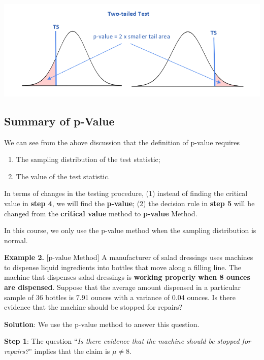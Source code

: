 \documentclass[
]{book}
\begin{document}
\begin{center}\includegraphics[width=0.65\linewidth]{week09/twoTailedPVal} \end{center}

\hypertarget{summary-of-p-value}{%
\subsection{Summary of p-Value}\label{summary-of-p-value}}

We can see from the above discussion that the definition of p-value requires

\begin{enumerate}
\def\labelenumi{\arabic{enumi}.}
\item
  The sampling distribution of the test statistic;
\item
  The value of the test statistic.
\end{enumerate}

In terms of changes in the testing procedure, (1) instead of finding the critical value in \textbf{step 4}, we will find the \textbf{p-value}; (2) the decision rule in \textbf{step 5} will be changed from the \textbf{critical value} method to \textbf{p-value} Method.

In this course, we only use the p-value method when the sampling distribution is normal.

\hfill\break

\textbf{Example 2.} {[}p-value Method{]} A manufacturer of salad dressings uses machines to dispense liquid ingredients into bottles that move along a filling line. The machine that dispenses salad dressings is \textbf{working properly when 8 ounces are dispensed}. Suppose that the average amount dispensed in a particular sample of 36 bottles is 7.91 ounces with a variance of 0.04 ounces. Is there evidence that the machine should be stopped for repairs?

\textbf{Solution}: We use the p-value method to answer this question.

\textbf{Step 1}: The question ``\emph{Is there evidence that the machine should be stopped for repairs?}'' implies that the claim is \(\mu \ne 8\).
\end{document}
